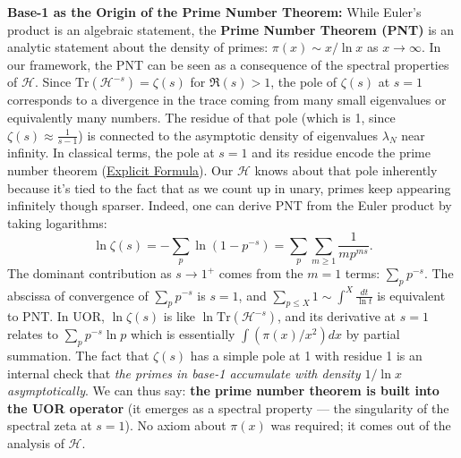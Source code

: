 \documentclass{article}
\begin{document}
\textbf{Base-1 as the Origin of the Prime Number Theorem:} While Euler’s product is an algebraic statement, the \textbf{Prime Number Theorem (PNT)} is an analytic statement about the density of primes: $\pi(x) \sim x/\ln x$ as $x\to\infty$. In our framework, the PNT can be seen as a consequence of the spectral properties of $\mathcal{H}$. Since $\mathrm{Tr}(\mathcal{H}^{-s}) = \zeta(s)$ for $\Re(s)>1$, the pole of $\zeta(s)$ at $s=1$ corresponds to a divergence in the trace coming from many small eigenvalues or equivalently many numbers. The residue of that pole (which is 1, since $\zeta(s)\approx \frac{1}{s-1}$) is connected to the asymptotic density of eigenvalues $\lambda_N$ near infinity. In classical terms, the pole at $s=1$ and its residue encode the prime number theorem (\href{https://www.researchgate.net/publication/51214444_H_xp_Model_Revisited_and_the_Riemann_Zeros#:~:text=,}{Explicit Formula}). Our $\mathcal{H}$ knows about that pole inherently because it’s tied to the fact that as we count up in unary, primes keep appearing infinitely though sparser. Indeed, one can derive PNT from the Euler product by taking logarithms: 
$$
\ln \zeta(s) = -\sum_p \ln(1-p^{-s}) = \sum_p \sum_{m\ge1} \frac{1}{m p^{ms}}.
$$
The dominant contribution as $s\to1^+$ comes from the $m=1$ terms: $\sum_p p^{-s}$. The abscissa of convergence of $\sum_p p^{-s}$ is $s=1$, and $\sum_{p\le X}1 \sim \int^X \frac{dt}{\ln t}$ is equivalent to PNT. In UOR, $\ln \zeta(s)$ is like $\ln \mathrm{Tr}(\mathcal{H}^{-s})$, and its derivative at $s=1$ relates to $\sum_p p^{-s}\ln p$ which is essentially $\int (\pi(x)/x^2) dx$ by partial summation. The fact that $\zeta(s)$ has a simple pole at 1 with residue 1 is an internal check that \emph{the primes in base-1 accumulate with density $1/\ln x$ asymptotically}. We can thus say: \textbf{the prime number theorem is built into the UOR operator} (it emerges as a spectral property --- the singularity of the spectral zeta at $s=1$). No axiom about $\pi(x)$ was required; it comes out of the analysis of $\mathcal{H}$.

\medskip
\end{document}
